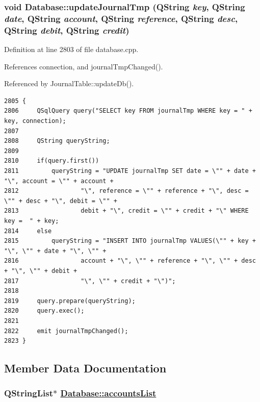 \hypertarget{classDatabase_a41}{
\subsubsection[updateJournalTmp]{\setlength{\rightskip}{0pt plus 5cm}void Database::update\-Journal\-Tmp (QString {\em key}, QString {\em date}, QString {\em account}, QString {\em reference}, QString {\em desc}, QString {\em debit}, QString {\em credit})}}
\label{classDatabase_a41}


Definition at line 2803 of file database.cpp.

References connection, and journal\-Tmp\-Changed().

Referenced by Journal\-Table::update\-Db().

\footnotesize\begin{verbatim}2805 {
2806     QSqlQuery query("SELECT key FROM journalTmp WHERE key = " + key, connection);
2807     
2808     QString queryString;
2809     
2810     if(query.first())
2811         queryString = "UPDATE journalTmp SET date = \"" + date + "\", account = \"" + account +
2812                 "\", reference = \"" + reference + "\", desc = \"" + desc + "\", debit = \"" +
2813                 debit + "\", credit = \"" + credit + "\" WHERE key =  " + key;
2814     else
2815         queryString = "INSERT INTO journalTmp VALUES(\"" + key + "\", \"" + date + "\", \"" +
2816                 account + "\", \"" + reference + "\", \"" + desc + "\", \"" + debit +
2817                 "\", \"" + credit + "\")";
2818     
2819     query.prepare(queryString);
2820     query.exec();
2821     
2822     emit journalTmpChanged();
2823 }
\end{verbatim}\normalsize 




\subsection{Member Data Documentation}
\hypertarget{classDatabase_r7}{
\subsubsection[accountsList]{\setlength{\rightskip}{0pt plus 5cm}QString\-List$\ast$ \hyperlink{classDatabase_r7}{Database::accounts\-List}}}
\label{classDatabase_r7}


